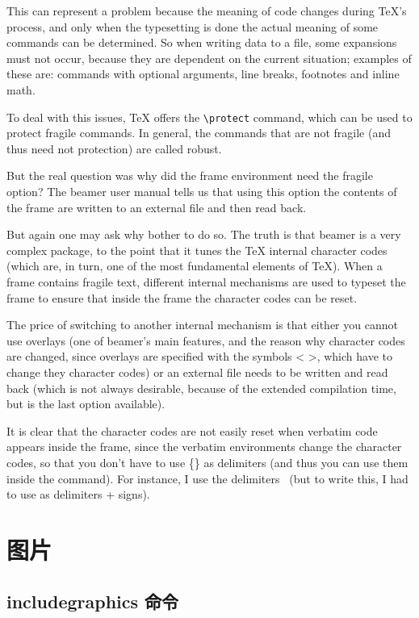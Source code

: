 This can represent a problem because the meaning of code changes during {\TeX}'s process, and only when the typesetting is done the actual meaning of some commands can be determined. So when writing data to a file, some expansions must not occur, because they are dependent on the current situation; examples of these are: commands with optional arguments, line breaks, footnotes and inline math.

To deal with this issues, {\TeX} offers the \verb|\protect| command, which can be used to protect fragile commands. In general, the commands that are not fragile (and thus need not protection) are called robust.

But the real question was why did the frame environment need the fragile option? The beamer user manual tells us that using this option the contents of the frame are written to an external file and then read back.

But again one may ask why bother to do so. The truth is that beamer is a very complex package, to the point that it tunes the {\TeX} internal character codes (which are, in turn, one of the most fundamental elements of {\TeX}). When a frame contains fragile text, different internal mechanisms are used to typeset
the frame to ensure that inside the frame the character codes can be reset.

The price of switching to another internal mechanism is that either you cannot use overlays (one of beamer’s main features, and the reason why character codes are changed, since overlays are specified with the symbols < >, which have to change they character codes) or an external file needs to be written and read back (which is not always desirable, because of the extended compilation time, but is the last option available).

It is clear that the character codes are not easily reset when verbatim code appears inside the frame, since the verbatim environments change the character codes, so that you don’t have to use \{\} as delimiters (and thus you can use them inside the command). For instance, I use the delimiters \verb| |(but to write this, I had to use as delimiters + signs).

\section{图片}

\subsection{{\ttfamily includegraphics} 命令}

